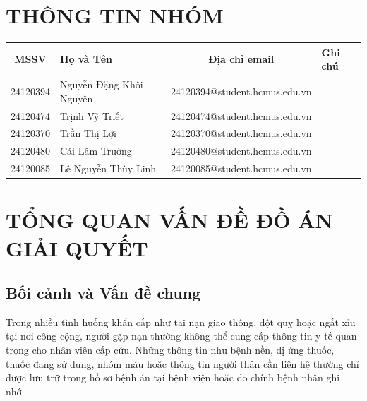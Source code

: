 \documentclass[a4paper,12pt]{article}
\begin{document}
\newpage
\tableofcontents
\newpage


\section{THÔNG TIN NHÓM}

\begin{table}[h]
        \centering
        \begin{tabular}{|c|l|c|l|}
        \hline
        \textbf{MSSV} & \textbf{Họ và Tên} & \textbf{Địa chỉ email} & \textbf{Ghi chú} \\
        \hline
        24120394 & Nguyễn Đặng Khôi Nguyên & 24120394@student.hcmus.edu.vn & \\
        \hline
        24120474 & Trịnh Vỹ Triết & 24120474@student.hcmus.edu.vn & \\
        \hline
        24120370 & Trần Thị Lợi & 24120370@student.hcmus.edu.vn & \\
        \hline
        24120480 & Cái Lâm Trường & 24120480@student.hcmus.edu.vn & \\
        \hline
        24120085 & Lê Nguyễn Thùy Linh & 24120085@student.hcmus.edu.vn & \\
        \hline
        \end{tabular}
    \end{table}

\section{TỔNG QUAN VẤN ĐỀ ĐỒ ÁN GIẢI QUYẾT}

\subsection{Bối cảnh và Vấn đề chung}

Trong nhiều tình huống khẩn cấp như tai nạn giao thông, đột quỵ hoặc ngất xỉu tại nơi công
cộng, người gặp nạn thường không thể cung cấp thông tin y tế quan trọng cho nhân viên
cấp cứu. Những thông tin như bệnh nền, dị ứng thuốc, thuốc đang sử dụng, nhóm máu hoặc
thông tin người thân cần liên hệ thường chỉ được lưu trữ trong hồ sơ bệnh án tại bệnh viện
hoặc do chính bệnh nhân ghi nhớ.
\end{document}
